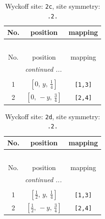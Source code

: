 \documentclass[fleqn,8pt]{jsarticle}
\begin{document}
\begin{longtable}{ccc}
\caption{Wyckoff site: {\tt 2c}, site symmetry: {\tt .2.}}
 \\
 \hline \hline
No. & position & mapping \\ \hline \endfirsthead

\multicolumn{2}{l}{\tablename\ \thetable{}} \\
 \hline \hline
No. & position & mapping \\ \hline \endhead

 \hline \hline
\multicolumn{2}{r}{\footnotesize\it continued ...} \\ \endfoot

 \hline \hline
\multicolumn{2}{r}{} \\ \endlastfoot

1 & $\left[ 0,\, y,\, \frac{1}{4} \right]$ & {\tt [1,3]} \\ \hline
2 & $\left[ 0,\, - y,\, \frac{3}{4} \right]$ & {\tt [2,4]} \\
\end{longtable}
\renewcommand{\arraystretch}{1.2}
\begin{longtable}{ccc}
\caption{Wyckoff site: {\tt 2d}, site symmetry: {\tt .2.}}
 \\
 \hline \hline
No. & position & mapping \\ \hline \endfirsthead

\multicolumn{2}{l}{\tablename\ \thetable{}} \\
 \hline \hline
No. & position & mapping \\ \hline \endhead

 \hline \hline
\multicolumn{2}{r}{\footnotesize\it continued ...} \\ \endfoot

 \hline \hline
\multicolumn{2}{r}{} \\ \endlastfoot

1 & $\left[ \frac{1}{2},\, y,\, \frac{1}{4} \right]$ & {\tt [1,3]} \\ \hline
2 & $\left[ \frac{1}{2},\, - y,\, \frac{3}{4} \right]$ & {\tt [2,4]} \\
\end{longtable}
\renewcommand{\arraystretch}{1.2}
\end{document}
